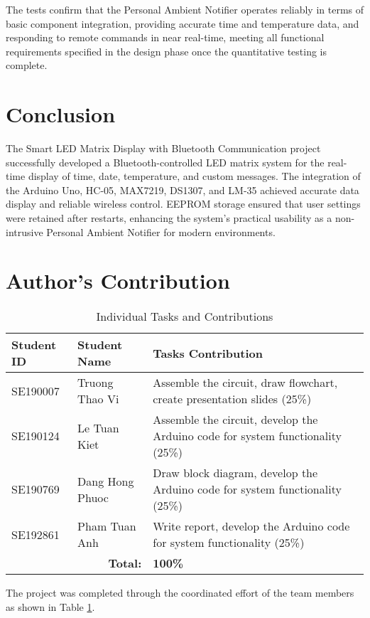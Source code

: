 \documentclass[a4paper, 10pt]{article}
\begin{document}
	The tests confirm that the Personal Ambient Notifier operates reliably in terms of basic component integration, providing accurate time and temperature data, and responding to remote commands in near real-time, meeting all functional requirements specified in the design phase once the quantitative testing is complete.
	
	\section{Conclusion}
	The Smart LED Matrix Display with Bluetooth Communication project successfully developed a Bluetooth-controlled LED matrix system for the real-time display of time, date, temperature, and custom messages. The integration of the Arduino Uno, HC-05, MAX7219, DS1307, and LM-35 achieved accurate data display and reliable wireless control. EEPROM storage ensured that user settings were retained after restarts, enhancing the system's practical usability as a non-intrusive Personal Ambient Notifier for modern environments.
	
	\section{Author's Contribution}
	\begin{table}[htbp]
		\centering
		\caption{Individual Tasks and Contributions}
		\begin{tabularx}{\textwidth}{@{}llX@{}}
			\toprule
			\textbf{Student ID} & \textbf{Student Name} & \textbf{Tasks Contribution} \\
			\midrule
			SE190007 & Truong Thao Vi & Assemble the circuit, draw flowchart, create presentation slides (25\%) \\
			SE190124 & Le Tuan Kiet & Assemble the circuit, develop the Arduino code for system functionality (25\%) \\
			SE190769 & Dang Hong Phuoc & Draw block diagram, develop the Arduino code for system functionality (25\%) \\
			SE192861 & Pham Tuan Anh & Write report, develop the Arduino code for system functionality (25\%) \\
			\bottomrule
			\multicolumn{2}{r}{\textbf{Total:}} & \textbf{100\%} \\
		\end{tabularx}
		\label{tab:contribution}
	\end{table}
	The project was completed through the coordinated effort of the team members as shown in Table \ref{tab:contribution}.
	
	\newpage
	\printbibliography[heading=bibintoc, title={References}]
	
\end{document}
